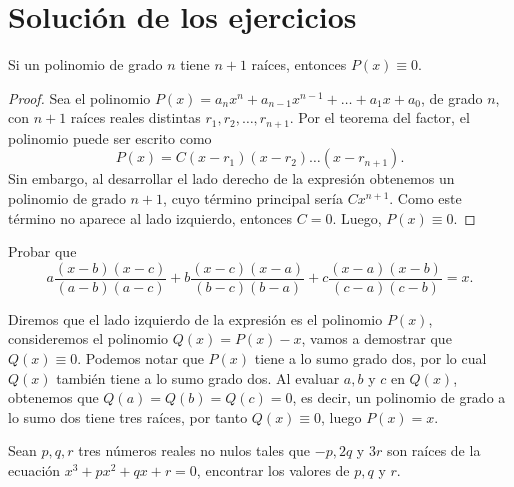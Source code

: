 \section{Solución de los ejercicios}

\begin{corollary}
    Si un polinomio de grado $n$ tiene $n + 1$ raíces, entonces $P(x) \equiv 0$.
\end{corollary}
\begin{proof}
    Sea el polinomio $P(x) = a_n x^n + a_{n - 1} x^{n - 1} + \ldots + a_1 x + a_0$,
    de grado $n$, con $n + 1$ raíces reales distintas $r_1, r_2, \ldots, r_{n + 1}$.
    Por el teorema del factor, el polinomio puede ser escrito como
    \[
        P(x) = C (x - r_1)(x - r_2) \ldots (x - r_{n + 1}).
    \]
    Sin embargo, al desarrollar el lado derecho de la expresión obtenemos un polinomio de grado $n + 1$, cuyo término principal sería $C x^{n + 1}$.
    Como este término no aparece al lado izquierdo, entonces $C = 0$.
    Luego, $P(x) \equiv 0$.
\end{proof}

\begin{exercise}
    Probar que
    \[
        a \frac{(x - b)(x - c)}{(a - b)(a - c)} + b \frac{(x - c)(x - a)}{(b - c)(b - a)} + c \frac{(x - a)(x - b)}{(c - a)(c - b )} = x.
    \]
\end{exercise}

\begin{solution}
    Diremos que el lado izquierdo de la expresión es el polinomio $P(x)$, consideremos el polinomio $Q(x) = P(x) - x$, vamos a demostrar que $Q(x) \equiv 0$.
    Podemos notar que $P(x)$ tiene a lo sumo grado dos, por lo cual $Q(x)$ también tiene a lo sumo grado dos.
    Al evaluar $a, b$ y $c$ en $Q(x)$, obtenemos que $Q(a) = Q(b) = Q(c) = 0$, es decir, un polinomio de grado a lo sumo dos tiene tres raíces, por tanto $Q(x) \equiv 0$, luego $P(x) = x$.
\end{solution}

\begin{exercise}
    Sean $p,q,r$ tres números reales no nulos tales que $-p, 2q$ y $3r$ son raíces de la ecuación $x^3 + px^2 + qx + r = 0$, encontrar los valores de $p,q$ y $r$.
\end{exercise}

